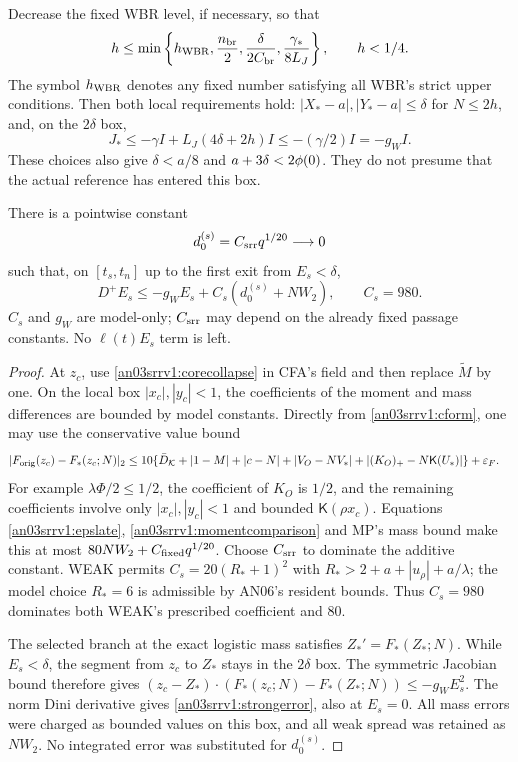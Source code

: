 \documentclass[11pt]{article}
\numberwithin{equation}{section}
\theoremstyle{remark}\newtheorem{remark}[theorem]{Remark}
\newcommand{\KK}{\mathcal K}\newcommand{\BB}{\mathcal B}
\newcommand{\Kfun}{\mathsf K}\newcommand{\Ffun}{\mathsf F}
\begin{document}
Decrease the fixed WBR level, if necessary, so that
\begin{equation}
 h\le\min\left\{h_{\rm WBR},\frac{n_{\rm br}}2,
       \frac{\delta}{2C_{\rm br}},\frac{\gamma_*}{8L_J}\right\},
 \qquad h<1/4.
 \label{an03srrv1:hbound}
\end{equation}
The symbol $h_{\rm WBR}$ denotes any fixed number satisfying all
WBR's strict upper conditions. Then both local requirements hold:
$|X_*-a|,|Y_*-a|\le\delta$ for $N\le2h$, and, on the $2\delta$ box,
\[
 J_*\le-\gamma I+L_J(4\delta+2h)I
       \le-(\gamma/2)I=-g_WI.
\]
These choices also give $\delta<a/8$ and $a+3\delta<2\phi(0)$.
They do not presume that the actual reference has entered this box.

\begin{proposition}
\label{an03srrv1:strong}
There is a pointwise constant
\begin{equation}
 d_0^{(s)}=C_{\rm srr}q^{1/20}\longrightarrow0
 \label{an03srrv1:d0}
\end{equation}
such that, on $[t_s,t_n]$ up to the first exit from $E_s<\delta$,
\begin{equation}
 D^+E_s\le-g_WE_s+C_s(d_0^{(s)}+NW_2),\qquad C_s=980.
 \label{an03srrv1:strongerror}
\end{equation}
$C_s$ and $g_W$ are model-only; $C_{\rm srr}$ may depend on
the already fixed passage constants. No $\ell(t)E_s$ term is left.
\end{proposition}
\begin{proof}
At $z_c$, use \eqref{an03srrv1:corecollapse} in CFA's field and then
replace $\widetilde M$ by one. On the local box $|x_c|,|y_c|<1$,
the coefficients of the moment and mass differences are bounded by
model constants. Directly from \eqref{an03srrv1:cform}, one may use
the conservative value bound
\begin{align*}
 |F_{\rm orig}(z_c)-F_*(z_c;N)|_2
 \le{}&10\{\bar D_\KK+|1-M|+|c-N|
       +|V_O-NV_*|+|(K_O)_+-N\Kfun(U_*)|\}+\eps_F.
\end{align*}
For example $\lambda\Phi/2\le1/2$, the coefficient of $K_O$
is $1/2$, and the remaining coefficients involve only $|x_c|,|y_c|<1$
and bounded $\Kfun(\rho x_c)$. Equations
\eqref{an03srrv1:epslate}, \eqref{an03srrv1:momentcomparison} and
MP's mass bound make this at most
$80NW_2+C_{\rm fixed}q^{1/20}$.
Choose $C_{\rm srr}$ to dominate the additive constant.
WEAK permits $C_s=20(R_*+1)^2$ with
$R_*>2+a+|u_\rho|+a/\lambda$; the model choice $R_*=6$ is
admissible by AN06's resident bounds. Thus $C_s=980$ dominates
both WEAK's prescribed coefficient and $80$.

The selected branch at the exact logistic mass satisfies
$Z_*'=F_*(Z_*;N)$. While $E_s<\delta$, the segment from
$z_c$ to $Z_*$ stays in the $2\delta$ box. The symmetric Jacobian
bound therefore gives
$(z_c-Z_*)\cdot(F_*(z_c;N)-F_*(Z_*;N))\le-g_WE_s^2$.
The norm Dini derivative gives \eqref{an03srrv1:strongerror},
also at $E_s=0$. All mass errors were charged as bounded values
on this box, and all weak spread was retained as $NW_2$.
No integrated error was substituted for $d_0^{(s)}$.
\end{proof}
\end{document}
